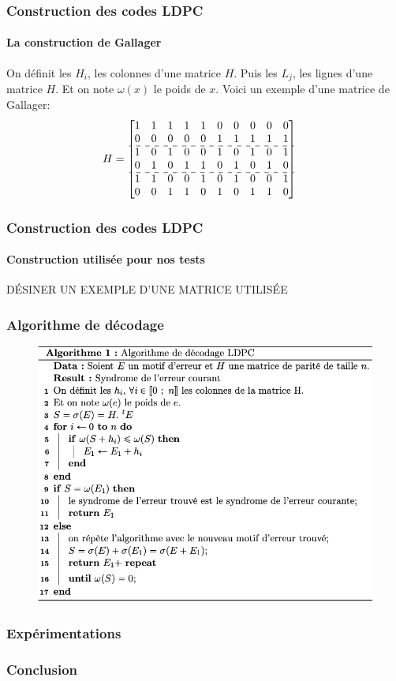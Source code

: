 \documentclass{beamer}
\begin{document}
    \begin{frame}
        \frametitle{Construction des codes LDPC}
        \framesubtitle{La construction de Gallager}
        On définit les $H_{i}$, les colonnes d'une matrice $H$.\newline
        Puis les $L_{j}$, les lignes d'une matrice $H$.\newline
        Et on note $\omega(x)$ le poids de $x$.\newline
        Voici un exemple d'une matrice de Gallager:
        $$H=
        \begin{bmatrix}
            1 & 1 & 1 & 1 & 1 & 0 & 0 & 0 & 0 & 0 \\
            0 & 0 & 0 & 0 & 0 & 1 & 1 & 1 & 1 & 1 \\
            \hdashline
            1 & 0 & 1 & 0 & 0 & 1 & 0 & 1 & 0 & 1 \\
            0 & 1 & 0 & 1 & 1 & 0 & 1 & 0 & 1 & 0 \\
            \hdashline
            1 & 1 & 0 & 0 & 1 & 0 & 1 & 0 & 0 & 1 \\
            0 & 0 & 1 & 1 & 0 & 1 & 0 & 1 & 1 & 0 
        \end{bmatrix}
        \quad
        $$
    \end{frame}

    \begin{frame}
        \frametitle{Construction des codes LDPC}
        \framesubtitle{Construction utilisée pour nos tests}
        DÉSINER UN EXEMPLE D'UNE MATRICE UTILISÉE
    \end{frame}

    \begin{frame}
        \frametitle{Algorithme de décodage}
        \begin{figure}[!h]
            \centering
            \includegraphics[scale=0.65]{algo.png}  
            \label{fig:algo}
        \end{figure}
    \end{frame}

    \begin{frame}
        \frametitle{Expérimentations}
    \end{frame}

    \begin{frame}
        \frametitle{Conclusion}
    \end{frame}
\end{document}
